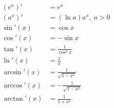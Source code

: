 \documentclass[a4paper,twoside, 11pt]{article}
\begin{document}
\begin{align*}
    (e^x)' &= e^x\\
    (a^x)' &= (\ln{a})a^x, \; a > 0\\
    \sin'(x) &= \cos x\\
    \cos'(x) &= -\sin x\\
    \tan'(x) &= \frac{1}{\cos^2 x}\\
    \ln'(x) &= \frac{1}{x}\\
    \arcsin'(x) &= \frac{1}{\sqrt{1 - x^2}}\\
    \arccos'(x) &= -\frac{1}{\sqrt{1 - x^2}}\\
    \arctan'(x) &= \frac{1}{1 + x^2}\\
\end{align*}
\end{document}
